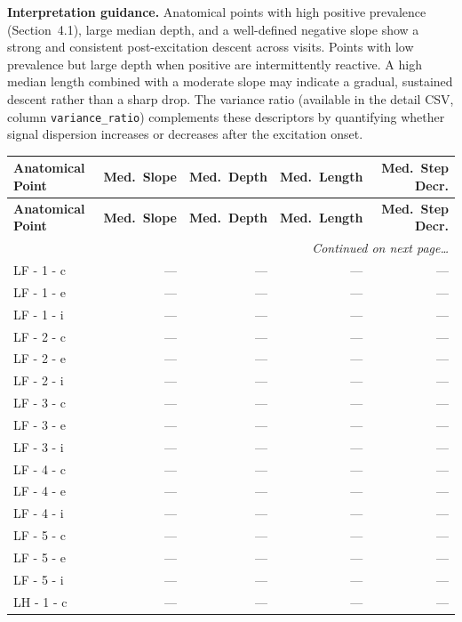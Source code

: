 \documentclass[a4paper,11pt]{article}
\begin{document}
\medskip
\noindent\textbf{Interpretation guidance.}
Anatomical points with high positive prevalence (Section~4.1), large median depth, and a
well-defined negative slope show a strong and consistent post-excitation descent across
visits.
Points with low prevalence but large depth when positive are intermittently reactive.
A high median length combined with a moderate slope may indicate a gradual, sustained
descent rather than a sharp drop.
The variance ratio (available in the detail CSV, column \texttt{variance\_ratio}) complements
these descriptors by quantifying whether signal dispersion increases or decreases after the
excitation onset.

\begin{small}
\begin{longtable}{p{4.5cm}rrrr}
\toprule
\textbf{Anatomical Point} &
\textbf{Med.\ Slope} &
\textbf{Med.\ Depth} &
\textbf{Med.\ Length} &
\textbf{Med.\ Step Decr.} \\
\midrule
\endfirsthead
\toprule
\textbf{Anatomical Point} &
\textbf{Med.\ Slope} &
\textbf{Med.\ Depth} &
\textbf{Med.\ Length} &
\textbf{Med.\ Step Decr.} \\
\midrule
\endhead
\midrule
\multicolumn{5}{r}{\small\emph{Continued on next page\ldots}} \\
\endfoot
\bottomrule
\endlastfoot
LF - 1 - c & --- & --- & --- & --- \\
LF - 1 - e & --- & --- & --- & --- \\
LF - 1 - i & --- & --- & --- & --- \\
LF - 2 - c & --- & --- & --- & --- \\
LF - 2 - e & --- & --- & --- & --- \\
LF - 2 - i & --- & --- & --- & --- \\
LF - 3 - c & --- & --- & --- & --- \\
LF - 3 - e & --- & --- & --- & --- \\
LF - 3 - i & --- & --- & --- & --- \\
LF - 4 - c & --- & --- & --- & --- \\
LF - 4 - e & --- & --- & --- & --- \\
LF - 4 - i & --- & --- & --- & --- \\
LF - 5 - c & --- & --- & --- & --- \\
LF - 5 - e & --- & --- & --- & --- \\
LF - 5 - i & --- & --- & --- & --- \\
LH - 1 - c & --- & --- & --- & --- \\

\end{longtable}
\end{small}
\end{document}
